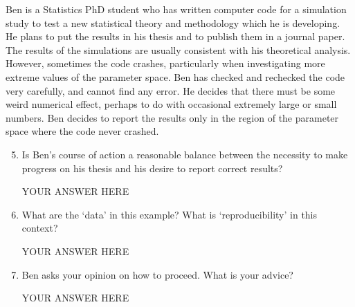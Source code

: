 \documentclass[12pt]{article}
\begin{document}
Ben is a Statistics PhD student who has written computer code for a simulation study to test a new statistical theory and methodology which he is developing.
He plans to put the results in his thesis and to publish them in a journal paper.
The results of the simulations are usually consistent with his theoretical analysis. 
However, sometimes the code crashes, particularly when investigating more extreme values of the parameter space.
Ben has checked and rechecked the code very carefully, and cannot find any error.
He decides that there must be some weird numerical effect, perhaps to do with occasional extremely large or small numbers.
Ben decides to report the results only in the region of the parameter space where the code never crashed. 
\begin{enumerate}\setcounter{enumi}{4}
\item Is Ben's course of action a reasonable balance between the necessity to make progress on his thesis and his desire to report correct results? 

YOUR ANSWER HERE

\item What are the `data' in this example? What is `reproducibility' in this context?

YOUR ANSWER HERE

\item Ben asks your opinion on how to proceed. What is your advice?

YOUR ANSWER HERE
\end{enumerate}
\end{document}
